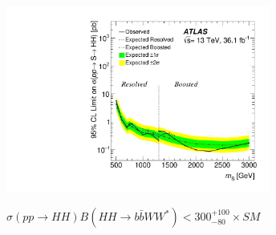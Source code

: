 \documentclass{beamer}
\newcommand*{\header}[1]{\fontsize{16}{8}\selectfont \textbf{{\color{MyPurple}{#1}}}}
\begin{document}
\begin{frame}
\begin{center}
\header{Combined Limit}
\end{center}
\begin{center}
\includegraphics[width=0.65\textwidth]{figures/limit_2016_reOpt_HiggsApproved_Scalar_Paper_Combined_20190312_01}
\end{center}
\small
\vspace{-0.5cm}$\sigma(pp\rightarrow{}HH)B(HH\rightarrow{}b\bar{b}WW^*) < 300^{+100}_{-80} \times{} SM$
\end{frame}
\end{document}
